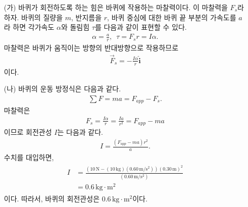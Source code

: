 \documentclass[floatfix,nofootinbib,superscriptaddress,fleqn]{revtex4-2}
\begin{document}
\begin{itemize}
  \item[(가)] 바퀴가 회전하도록 하는 힘은 바퀴에 작용하는 마찰력이다.
  이 마찰력을 $F_s$라 하자.
  바퀴의 질량을 $m$, 반지름을 $r$, 바퀴 중심에 대한 바퀴 끝 부분의 가속도를 
  $a$라 하면
  각가속도 $\alpha$와 돌림힘 $\tau$를 다음과 같이 표현할 수 있다.
  \begin{align}
    \alpha=\frac{a}{r},\,\,\, \tau = F_s r = I\alpha.
  \end{align}
  마찰력은 바퀴가 움직이는 방향의 반대방향으로 작용하므로
  \begin{align}
    \vec{F}_s = -\frac{I\alpha}{r}\hat{\bm i}
  \end{align}
  이다.
  \item[(나)]
  바퀴의 운동 방정식은 다음과 같다.
  \begin{align}
    \sum F = ma = F_{app} - F_s.
  \end{align}
  마찰력은
  \begin{align}
    F_s=\frac{I\alpha}{r} = \frac{Ia}{r^2} = F_{app}-ma
  \end{align}
이므로 회전관성 $I$는 다음과 같다.
\begin{align}
  I = \frac{(F_{app}-ma)r^2}{a}.
\end{align}
  수치를 대입하면,
  \begin{align}
    \begin{split}
      I &= \frac{(10\,\mathrm{N} - (10\,\mathrm{kg})(0.60\,\mathrm{m/s^2}))
      (0.30\,\mathrm{m})^2}{(0.60\,\mathrm{m/s^2})} \\
      &=0.6\,\mathrm{kg\cdot m^2}
    \end{split}
  \end{align}
  이다. 따라서, 바퀴의 회전관성은 $0.6\,\mathrm{kg\cdot m^2}$이다.
\end{itemize}

\vspace{1.cm}
\end{document}
